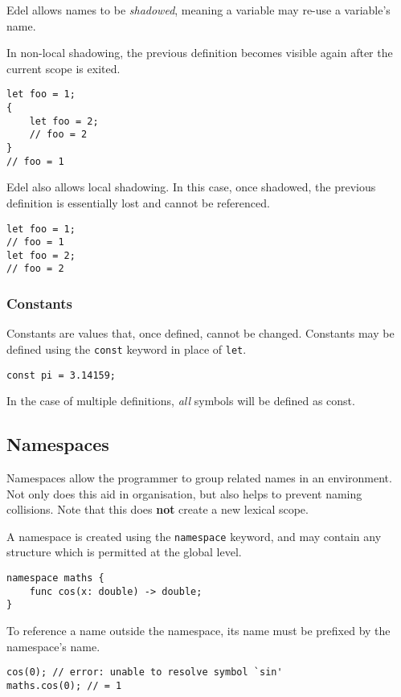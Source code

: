 Edel allows names to be \textit{shadowed}, meaning a variable may re-use a variable's name.

In non-local shadowing, the previous definition becomes visible again after the current scope is exited.
\begin{lstlisting}[language=CustomLang]
let foo = 1;
{
    let foo = 2;
    // foo = 2
}
// foo = 1
\end{lstlisting}

Edel also allows local shadowing.
In this case, once shadowed, the previous definition is essentially lost and cannot be referenced.
\begin{lstlisting}[language=CustomLang]
let foo = 1;
// foo = 1
let foo = 2;
// foo = 2
\end{lstlisting}

\subsubsection{Constants}

Constants are values that, once defined, cannot be changed.
Constants may be defined using the \texttt{const} keyword in place of \texttt{let}.

\begin{lstlisting}[language=CustomLang]
const pi = 3.14159;
\end{lstlisting}

In the case of multiple definitions, \textit{all} symbols will be defined as const.

\subsection{Namespaces}

Namespaces allow the programmer to group related names in an environment.
Not only does this aid in organisation, but also helps to prevent naming collisions.
Note that this does \textbf{not} create a new lexical scope.

A namespace is created using the \texttt{namespace} keyword, and may contain any structure which is permitted at the global level.

\begin{lstlisting}[language=CustomLang]
namespace maths {
    func cos(x: double) -> double;
}
\end{lstlisting}

To reference a name outside the namespace, its name must be prefixed by the namespace's name.

\begin{lstlisting}[language=CustomLang]
cos(0); // error: unable to resolve symbol `sin'
maths.cos(0); // = 1
\end{lstlisting}

